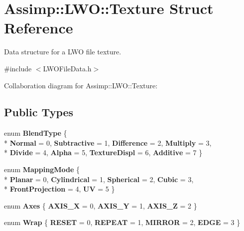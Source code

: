 \hypertarget{struct_assimp_1_1_l_w_o_1_1_texture}{\section{Assimp\+:\+:L\+W\+O\+:\+:Texture Struct Reference}
\label{struct_assimp_1_1_l_w_o_1_1_texture}
}


Data structure for a L\+W\+O file texture.  




{\ttfamily \#include $<$L\+W\+O\+File\+Data.\+h$>$}



Collaboration diagram for Assimp\+:\+:L\+W\+O\+:\+:Texture\+:
\subsection*{Public Types}
\begin{DoxyCompactItemize}
\item 
\hypertarget{struct_assimp_1_1_l_w_o_1_1_texture_adc2700cc009b7e699afc2bcb2a8b1340}{enum {\bfseries Blend\+Type} \{ \\*
{\bfseries Normal} = 0, 
{\bfseries Subtractive} = 1, 
{\bfseries Difference} = 2, 
{\bfseries Multiply} = 3, 
\\*
{\bfseries Divide} = 4, 
{\bfseries Alpha} = 5, 
{\bfseries Texture\+Displ} = 6, 
{\bfseries Additive} = 7
 \}}\label{struct_assimp_1_1_l_w_o_1_1_texture_adc2700cc009b7e699afc2bcb2a8b1340}

\item 
\hypertarget{struct_assimp_1_1_l_w_o_1_1_texture_a79cd73bbf5a48d00aa65679c5ec11f58}{enum {\bfseries Mapping\+Mode} \{ \\*
{\bfseries Planar} = 0, 
{\bfseries Cylindrical} = 1, 
{\bfseries Spherical} = 2, 
{\bfseries Cubic} = 3, 
\\*
{\bfseries Front\+Projection} = 4, 
{\bfseries U\+V} = 5
 \}}\label{struct_assimp_1_1_l_w_o_1_1_texture_a79cd73bbf5a48d00aa65679c5ec11f58}

\item 
\hypertarget{struct_assimp_1_1_l_w_o_1_1_texture_aaf48f76f2990a384d4630c55ea34eeff}{enum {\bfseries Axes} \{ {\bfseries A\+X\+I\+S\+\_\+\+X} = 0, 
{\bfseries A\+X\+I\+S\+\_\+\+Y} = 1, 
{\bfseries A\+X\+I\+S\+\_\+\+Z} = 2
 \}}\label{struct_assimp_1_1_l_w_o_1_1_texture_aaf48f76f2990a384d4630c55ea34eeff}

\item 
\hypertarget{struct_assimp_1_1_l_w_o_1_1_texture_a4316a78fd26b37c0162887c90d6e538c}{enum {\bfseries Wrap} \{ {\bfseries R\+E\+S\+E\+T} = 0, 
{\bfseries R\+E\+P\+E\+A\+T} = 1, 
{\bfseries M\+I\+R\+R\+O\+R} = 2, 
{\bfseries E\+D\+G\+E} = 3
 \}}\label{struct_assimp_1_1_l_w_o_1_1_texture_a4316a78fd26b37c0162887c90d6e538c}

\end{DoxyCompactItemize}
